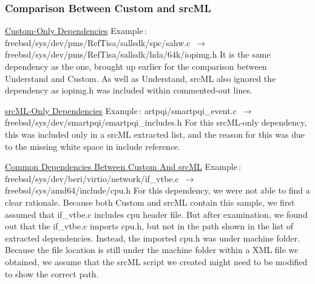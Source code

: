 \documentclass[12pt, dvipsnames, a4paper]{article}
\begin{document}
\subsubsection{Comparison Between Custom and srcML}
\underline{Custom-Only Dependencies}
\newline
\newline
Example$\,\colon\,$freebsd/sys/dev/pms/RefTisa/sallsdk/spc/sahw.c $\,\to\,$ freebsd/sys/dev/pms/RefTisa/sallsdk/hda/64k/iopimg.h
\newline
\newline
It is the same dependency as the one, brought up earlier for the comparison between Understand and Custom. As well as Understand, srcML also ignored the dependency as iopimg.h was included within commented-out lines. 

\underline{srcML-Only Dependencies}
\newline
\newline
Example$\,\colon\,$artpqi/smartpqi\_event.c $\,\to\,$ freebsd/sys/dev/smartpqi/smartpqi\_includes.h
\newline
\newline
For this srcML-only dependency, this was included only in a srcML extracted list, and the reason for this was due to the missing white space in include reference.

\underline{Common Dependencies Between Custom And srcML}
\newline
\newline
Example$\,\colon\,$freebsd/sys/dev/beri/virtio/network/if\_vtbe.c $\,\to\,$ freebsd/sys/amd64/include/cpu.h
\newline
\newline
For this dependency, we were not able to find a clear rationale. Because both Custom and srcML contain this sample, we first assumed that if\_vtbe.c includes cpu header file. But after examination, we found out that the if\_vtbe.c imports cpu.h, but not in the path shown in the list of extracted dependencies. Instead, the imported cpu.h was under machine folder. 
Because the file location is still under the machine folder within a XML file we obtained, we assume that the srcML script we created might need to be modified to show the correct path.
\end{document}
